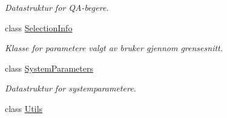\begin{DoxyCompactItemize}
\begin{DoxyCompactList}\small\item\em Datastruktur for Q\+A-\/begere. \end{DoxyCompactList}\item 
class \hyperlink{class_scintilab_1_1_selection_info}{Selection\+Info}
\begin{DoxyCompactList}\small\item\em Klasse for parametere valgt av bruker gjennom grensesnitt. \end{DoxyCompactList}\item 
class \hyperlink{class_scintilab_1_1_system_parameters}{System\+Parameters}
\begin{DoxyCompactList}\small\item\em Datastruktur for systemparametere. \end{DoxyCompactList}\item 
class \hyperlink{class_scintilab_1_1_utils}{Utils}
\end{DoxyCompactItemize}
